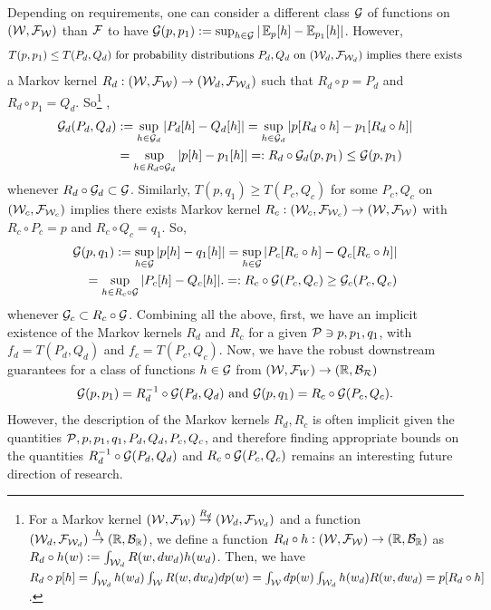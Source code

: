 \begin{remark}
    Depending on requirements, one can consider a different class $\mathcal{G}$ of functions on $(\mathcal{W}, \mathcal{F}_{\mathcal{W}})$ than $\mathcal{F}$ to have $\mathcal{G}(p, p_1):=\sup_{h \in \mathcal{G}}|\operatorname{{\mathbb E}}_p[h]- \operatorname{{\mathbb E}}_{p_1}[h]|$. However, 
    \begin{equation*}
    T(p,p_1) \leq T(P_d,Q_d) \text{ for probability  distributions } P_d, Q_d \text{ on }(\mathcal{W}_d, \mathcal{F}_{\mathcal{W}_d}) \text{ implies  there exists}
    \end{equation*}
    a Markov kernel $R_d:(\mathcal{W}, \mathcal{F}_{\mathcal{W}}) \to (\mathcal{W}_d, \mathcal{F}_{\mathcal{W}_d})$ such that $R_d\circ p= P_d$ and $R_d\circ p_1= Q_d$. So\footnote{For a Markov kernel $(\mathcal{W}, \mathcal{F}_{\mathcal{W}}) \overset{R_d}{\to}(\mathcal{W}_d, \mathcal{F}_{\mathcal{W}_d})$ and a function $(\mathcal{W}_d, \mathcal{F}_{\mathcal{W}_d} ) \overset{h}{\to} (\mathbb{R}, \mathcal{B}_{\mathbb{R}})$, we define a function $R_d \circ h : (\mathcal{W}, \mathcal{F}_{\mathcal{W}}) \to (\mathbb{R}, \mathcal{B}_{\mathbb{R}})$ as $R_d \circ h (w):= \int_{\mathcal{W}_d} R(w, dw_d) h(w_d)$. Then, we have \citet{kallenberg2021foundations} $R_d \circ p [h]=  \int_{\mathcal{W}_d} h(w_d) \int_{\mathcal{W}} R(w, dw_d) dp(w) =  \int_{\mathcal{W}} dp(w) \int_{\mathcal{W}_d} h(w_d)  R(w, dw_d)  =p [R_d \circ h]$.} ,
     \begin{align*}
    \mathcal{G}_d(P_d,Q_d)
    &
    := \sup_{h \in \mathcal{G}_d}|P_d[h]- Q_d[h]|
    = \sup_{h \in \mathcal{G}_d}|p[R_d\circ h]- p_1[R_d\circ h]|
    \\
    &
     = \sup_{h \in R_d\circ \mathcal{G}_d}|p[h]- p_1[h]| 
     =: R_d\circ \mathcal{G}_d (p,p_1) \leq \mathcal{G}(p,p_1)
     \end{align*}
     whenever $R_d \circ \mathcal{G}_d \subset \mathcal{G}$. Similarly, $T(p,q_1) \geq T(P_c,Q_c)$ for some $P_c, Q_c$ on $(\mathcal{W}_c, \mathcal{F}_{\mathcal{W}_c})$ implies there exists  Markov kernel $R_c:(\mathcal{W}_c, \mathcal{F}_{\mathcal{W}_c}) \to(\mathcal{W}, \mathcal{F}_{\mathcal{W}})$ with $R_c\circ P_c= p$ and $R_c\circ Q_c= q_1$. So, 
     \begin{align*}
     \mathcal{G}(p,q_1) 
     := \sup_{h \in \mathcal{G}}|p[h]- q_1[h]|
      = \sup_{h \in \mathcal{G}}|P_c[R_c \circ h]-  Q_c[R_c \circ h]|
     \\
     = \sup_{h \in R_c\circ \mathcal{G}}|P_c[h]-  Q_c[h]|.
     =: R_c\circ \mathcal{G} (P_c, Q_c) \geq \mathcal{G}_c(P_c, Q_c)
     \end{align*}
     whenever $\mathcal{G}_c \subset R_c\circ \mathcal{G}$. Combining all the above, first, we have an implicit existence of the Markov kernels $R_d$ and $ R_c$ for a given $\mathcal{P} \ni p, p_1, q_1$, with $f_d=T(P_d,Q_d)$ and $ f_c=T (P_c,Q_c)$. Now, we have the robust downstream guarantees for a class of functions $h\in \mathcal{G}$ from $(\mathcal{W}, \mathcal{F}_W) \to (\mathbb{R}, \mathcal{B}_{\mathcal{R}})$
     \begin{equation}
         \mathcal{G}(p,p_1) = R_d^{-1} \circ  \mathcal{G} (P_d, Q_d) \text{ and } \mathcal{G}(p,q_1) = R_c \circ \mathcal{G} (P_c,Q_c).
     \end{equation}
     However, the description of the Markov kernels $R_d, R_c$ is often implicit given the quantities $\mathcal{P}, p,p_1, q_1, P_d, Q_d, P_c, Q_c$, and therefore finding appropriate bounds on the quantities $R_d^{-1} \circ  \mathcal{G} (P_d, Q_d)$ and $R_c \circ \mathcal{G} (P_c,Q_c)$ remains an interesting future direction of research.
\end{remark}









